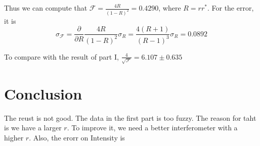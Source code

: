 \documentclass[aps,prl,reprint]{revtex4-1}
\begin{document}
Thus we can compute that $\mathcal{F} = \frac{4R}{(1-R)^2} = 0.4290$, where $R = rr^*$. For the error, it is 
\[
\sigma_\mathcal{F} = \frac{\partial}{\partial R} \frac{4R}{(1-R)^2} \sigma_R = \frac{4(R+1)}{(R-1)^3}\sigma_R  = 0.0892
\]

To compare with the result of part I, $\frac{4}{\sqrt{\mathcal{F}}} = 6.107\pm0.635$


\section{Conclusion}
The reust is not good. The data in the first part is too fuzzy. The reason for taht is we have a larger $r$. To improve it, we need a better interferometer with a higher $r$. Also, the erorr on Intensity is 








\end{document}
